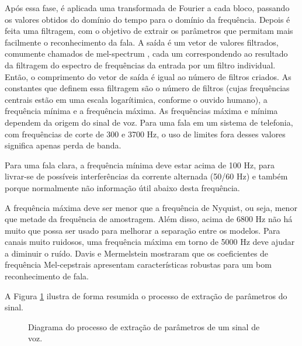 \documentclass[12pt,a4paper,oneside]{report}
\begin{document}
Após essa fase, é aplicada uma transformada de Fourier a cada bloco, passando os valores obtidos do domínio do tempo para o domínio da frequência. Depois é feita uma filtragem, com o objetivo de extrair os parâmetros que permitam mais facilmente o reconhecimento da fala. A saída é um vetor de valores filtrados, comumente chamados de mel-spectrum \cite{Cepstrum}, cada um correspondendo ao resultado da filtragem do espectro de frequências da entrada por um filtro individual. Então, o comprimento do vetor de saída é igual ao número de filtros criados. As constantes que definem essa filtragem são o número de filtros (cujas frequências centrais estão em uma escala logarítimica, conforme o ouvido humano), a frequência mínima e a frequência máxima. As frequências máxima e mínima dependem da origem do sinal de voz. Para uma fala em um sistema de telefonia, com frequências de corte de 300 e 3700 Hz, o uso de limites fora desses valores significa apenas perda de banda.

Para uma fala clara, a frequência mínima deve estar acima de 100 Hz, para livrar-se de possíveis interferências da corrente alternada (50/60 Hz) e também porque normalmente não informação útil abaixo desta frequência.

A frequência máxima deve ser menor que a frequência de Nyquist, ou seja, menor que metade da frequência de amostragem. Além disso, acima de 6800 Hz não há muito que possa ser usado para melhorar a separação entre os modelos. Para canais muito ruidosos, uma frequência máxima em torno de 5000 Hz deve ajudar a diminuir o ruído.
Davis e Mermelstein \cite{davis-mermelstein} mostraram que os coeficientes de frequência Mel-cepstrais apresentam características robustas para um bom reconhecimento de fala.

A Figura \ref{fig:extracao} ilustra de forma resumida o processo de extração de parâmetros do sinal.

\begin{figure}[h!]
\centering
{}\caption{Diagrama do processo de extração de parâmetros de um sinal de voz.}
\label{fig:extracao}
\end{figure}
\end{document}
